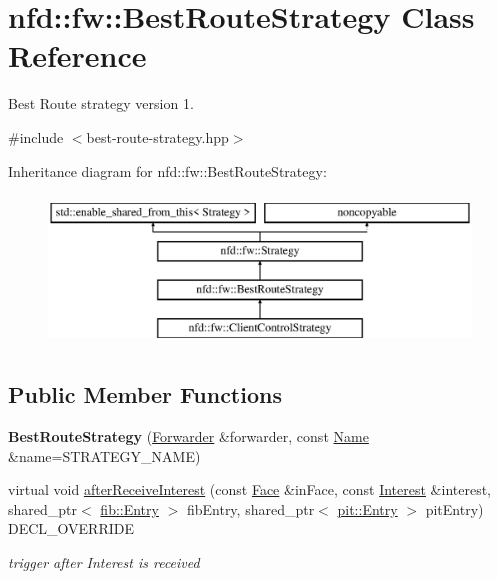\hypertarget{classnfd_1_1fw_1_1BestRouteStrategy}{}\section{nfd\+:\+:fw\+:\+:Best\+Route\+Strategy Class Reference}
\label{classnfd_1_1fw_1_1BestRouteStrategy}


Best Route strategy version 1.  




{\ttfamily \#include $<$best-\/route-\/strategy.\+hpp$>$}

Inheritance diagram for nfd\+:\+:fw\+:\+:Best\+Route\+Strategy\+:\begin{figure}[H]
\begin{center}
\leavevmode
\includegraphics[height=4.000000cm]{classnfd_1_1fw_1_1BestRouteStrategy}
\end{center}
\end{figure}
\subsection*{Public Member Functions}
\begin{DoxyCompactItemize}
\item 
{\bfseries Best\+Route\+Strategy} (\hyperlink{classnfd_1_1Forwarder}{Forwarder} \&forwarder, const \hyperlink{classndn_1_1Name}{Name} \&name=S\+T\+R\+A\+T\+E\+G\+Y\+\_\+\+N\+A\+ME)\hypertarget{classnfd_1_1fw_1_1BestRouteStrategy_ae32a9cd9709b4e4c4a6bef166efd2e19}{}\label{classnfd_1_1fw_1_1BestRouteStrategy_ae32a9cd9709b4e4c4a6bef166efd2e19}

\item 
virtual void \hyperlink{classnfd_1_1fw_1_1BestRouteStrategy_a85bc7a6cf35dd45793c616e89182b298}{after\+Receive\+Interest} (const \hyperlink{classnfd_1_1Face}{Face} \&in\+Face, const \hyperlink{classndn_1_1Interest}{Interest} \&interest, shared\+\_\+ptr$<$ \hyperlink{classnfd_1_1fib_1_1Entry}{fib\+::\+Entry} $>$ fib\+Entry, shared\+\_\+ptr$<$ \hyperlink{classnfd_1_1pit_1_1Entry}{pit\+::\+Entry} $>$ pit\+Entry) D\+E\+C\+L\+\_\+\+O\+V\+E\+R\+R\+I\+DE
\begin{DoxyCompactList}\small\item\em trigger after Interest is received \end{DoxyCompactList}\end{DoxyCompactItemize}

